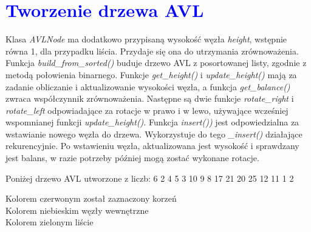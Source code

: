 \documentclass{article}
\begin{document}
	\newpage
	
	\section*{\textcolor{blue}{Tworzenie drzewa AVL}}
	\begin{multicols}{2}
		\noindent Klasa \textit{AVLNode} ma dodatkowo przypisaną wysokość węzła \textit{height}, wstępnie równa 1, dla przypadku liścia. Przydaje się ona do utrzymania zrównoważenia. Funkcja \textit{build\_from\_sorted()} buduje drzewo AVL z posortowanej listy, zgodnie z metodą połowienia binarnego. Funkcje \textit{get\_height()} i \textit{update\_height()} mają za zadanie obliczanie i aktualizowanie wysokości węzła, a funkcja \textit{get\_balance()} zwraca współczynnik zrównoważenia. Następne są dwie funkcje \textit{rotate\_right} i \textit{rotate\_left} odpowiadające za rotacje w prawo i w lewo, używające wcześniej wspomnianej funkcji \textit{update\_height()}. Funkcja \textit{insert())} jest odpowiedzialna za wstawianie nowego węzła do drzewa. Wykorzystuje do tego \textit{\_insert()} działające rekurencyjnie. Po wstawieniu węzła, aktualizowana jest wysokość i sprawdzany jest balans, w razie potrzeby później mogą zostać wykonane rotacje.

		\noindent Poniżej drzewo AVL utworzone z liczb: 6 2 4 5 3 10 9 8 17 21 20 25 12 11 1 2
		
		\noindent Kolorem czerwonym został zaznaczony korzeń \\
		Kolorem niebieskim węzły wewnętrzne \\
		Kolorem zielonym liście
			
		\vspace*{1cm}
		
		

\end{multicols}
\end{document}
